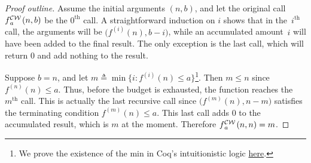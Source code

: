 \begin{proof}[Proof outline]
	Assume the initial arguments $(n, b)$, and let the original call 
	$\cdw{f}{a}(n, b)$ be the $0^{\text{th}}$ call. A straightforward induction on $i$ shows that in the~$i^{\text{th}}$ call, the arguments will be $\big(f^{(i)}(n), b-i\big)$, while an accumulated amount~$i$ will have been added to the final result. The only exception is the last call, which 
	will return $0$ and add nothing to the result.
	
	Suppose $b = n$, and let $m \triangleq \min\big\{i : f^{(i)}(n)\le a\big\}$\footnote{We prove the existence
		of the min in Coq’s intuitionistic logic
	  \href{https://github.com/inv-ack/inv-ack/blob/7270e64a2600b771f2b1b1b151f7d13fb2ae6c97/countdown.v\#L129-L159}{\color{blue}here}.}. Then $m \le n$ since $f^{(n)}(n)\le a$. Thus, before the budget is exhausted, the function reaches the $m^{\text{th}}$ call. This is actually the last recursive call since $\big(f^{(m)}(n), n - m\big)$ satisfies the terminating condition $f^{(m)}(n)\le a$. This last call adds $0$ to the accumulated result, which is $m$ at the moment. Therefore $\cdw{f}{a}(n, n) = m$.
\end{proof}
